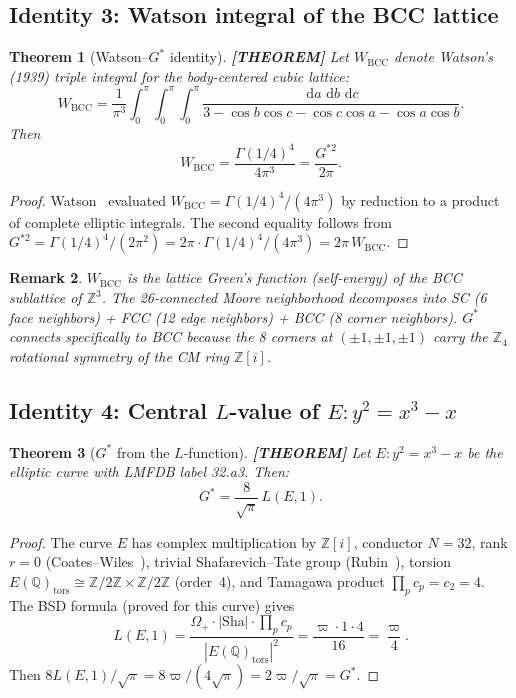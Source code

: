 \documentclass[11pt]{article}
\theoremstyle{tight}
\newtheorem{theorem}{Theorem}[section]
\theoremstyle{plainroman}
\newtheorem{remark}[theorem]{Remark}
\newcommand{\Z}{\mathbb{Z}}
\newcommand{\Q}{\mathbb{Q}}
\newcommand{\dd}{\,\mathrm{d}}
\begin{document}
\subsection{Identity 3: Watson integral of the BCC lattice}

\begin{theorem}[Watson--$G^*$ identity]\label{thm:watson}
\textbf{[THEOREM]}
Let $W_{\mathrm{BCC}}$ denote Watson's (1939) triple integral for the body-centered cubic lattice:
\[
W_{\mathrm{BCC}}=\frac{1}{\pi^3}\int_0^\pi\!\!\int_0^\pi\!\!\int_0^\pi\frac{\dd a\,\dd b\,\dd c}{3-\cos b\cos c-\cos c\cos a-\cos a\cos b}.
\]
Then
\begin{equation}\label{eq:watson}
W_{\mathrm{BCC}}=\frac{\Gamma(1/4)^4}{4\pi^3}=\frac{G^{*2}}{2\pi}.
\end{equation}
\end{theorem}
\begin{proof}
Watson~\cite{watson1939} evaluated $W_{\mathrm{BCC}}=\Gamma(1/4)^4/(4\pi^3)$ by reduction to a product of complete elliptic integrals.
The second equality follows from $G^{*2}=\Gamma(1/4)^4/(2\pi^2)=2\pi\cdot\Gamma(1/4)^4/(4\pi^3)=2\pi\,W_{\mathrm{BCC}}$.
\end{proof}

\begin{remark}
$W_{\mathrm{BCC}}$ is the lattice Green's function (self-energy) of the BCC sublattice of $\Z^3$.
The 26-connected Moore neighborhood decomposes into SC (6 face neighbors) + FCC (12 edge neighbors) + BCC (8 corner neighbors).
$G^*$ connects specifically to BCC because the 8 corners at $(\pm 1,\pm 1,\pm 1)$ carry the $\Z_4$ rotational symmetry of the CM ring $\Z[i]$.
\end{remark}

\subsection{Identity 4: Central $L$-value of $E:y^2=x^3-x$}

\begin{theorem}[$G^*$ from the $L$-function]\label{thm:gstar-L}
\textbf{[THEOREM]}
Let $E:y^2=x^3-x$ be the elliptic curve with LMFDB label 32.a3.
Then:
\begin{equation}\label{eq:gstar-L}
G^*=\frac{8}{\sqrt{\pi}}\,L(E,1).
\end{equation}
\end{theorem}
\begin{proof}
The curve $E$ has complex multiplication by $\Z[i]$, conductor $N=32$, rank $r=0$ (Coates--Wiles~\cite{coateswiles}), trivial Shafarevich--Tate group (Rubin~\cite{rubin}), torsion $E(\Q)_{\mathrm{tors}}\cong\Z/2\Z\times\Z/2\Z$ (order~4), and Tamagawa product $\prod_p c_p=c_2=4$.
The BSD formula (proved for this curve) gives
\[
L(E,1)=\frac{\Omega_+\cdot|\text{Sha}|\cdot\prod_p c_p}{|E(\Q)_{\mathrm{tors}}|^2}=\frac{\varpi\cdot 1\cdot 4}{16}=\frac{\varpi}{4}.
\]
Then $8L(E,1)/\sqrt{\pi}=8\varpi/(4\sqrt{\pi})=2\varpi/\sqrt{\pi}=G^*$.
\end{proof}
\end{document}
